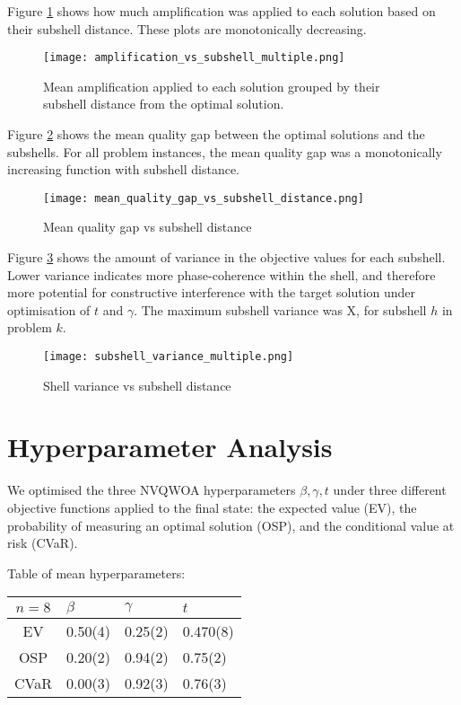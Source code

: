 Figure \ref{fig:amp vs sub} shows how much amplification was applied to each solution based on their subshell distance. These plots are monotonically decreasing. 
\begin{figure}[htbp]
    \centering
    \texttt{[image: amplification\_vs\_subshell\_multiple.png]}
    \caption{Mean amplification applied to each solution grouped by their subshell distance from the optimal solution.}
    \label{fig:amp vs sub}
\end{figure}

Figure \ref{fig:mqg} shows the mean quality gap between the optimal solutions and the subshells. For all problem instances, the mean quality gap was a monotonically increasing function with subshell distance.
\begin{figure}[htbp]
    \centering
    \texttt{[image: mean\_quality\_gap\_vs\_subshell\_distance.png]}
    \caption{Mean quality gap vs subshell distance}
    \label{fig:mqg}
\end{figure}

Figure \ref{fig:shell variance} shows the amount of variance in the objective values for each subshell.
Lower variance indicates more phase-coherence within the shell, and therefore more potential for constructive interference with the target solution under optimisation of $t$ and $\gamma$. The maximum subshell variance was X, for subshell $h$ in problem $k$.
\begin{figure}[htbp]
    \centering
    \texttt{[image: subshell\_variance\_multiple.png]}
    \caption{Shell variance vs subshell distance}
    \label{fig:shell variance}
\end{figure}

\section{Hyperparameter Analysis}
We optimised the three NVQWOA hyperparameters $\beta, \gamma, t$ under three different objective functions applied to the final state: the expected value (EV), the probability of measuring an optimal solution (OSP), and the conditional value at risk (CVaR).

Table of mean hyperparameters:

\begin{tabular}{c||l|l|l}
    $n=8$          & $\beta$ & $\gamma$ & $t$     \\\hline\hline
    EV & 0.50(4) & 0.25(2) & 0.470(8) \\\hline
    OSP & 0.20(2) & 0.94(2) & 0.75(2) \\\hline
    CVaR & 0.00(3) & 0.92(3) & 0.76(3) \\\hline
\end{tabular}

